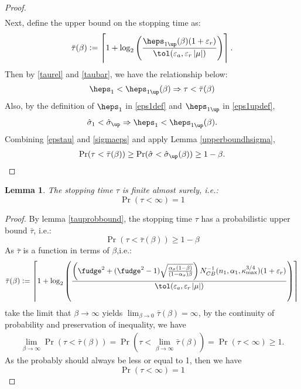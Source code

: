 \documentclass{iitthesis}
\newtheorem{lemma}[theorem]{Lemma}
\begin{document}
\begin{proof}
\begin{align}
\end{align}
Next, define the upper bound on the stopping time as: 
\begin{align}\label{taubarrel}
\bar{\tau}(\beta):= \left \lceil 1+\log_2 \left(\frac{\heps_{1\up}(\beta)(1+\varepsilon_r)}{ \tol(\varepsilon_a,\varepsilon_r \abs{\mu})}\right) \right \rceil.
\end{align}
Then by \eqref{taurel} and \eqref{taubar}, we have the relationship below:
\begin{align} \label{epstau}
 \heps_1 <\heps_{1\up}(\beta) \Rightarrow \tau <\bar{\tau}(\beta)
\end{align}
Also, by the definition of $\heps_1$ in \eqref{eps1def} and $\heps_{1\up}$ in \eqref{eps1updef},
\begin{align}\label{sigmaeps}
 \hsigma_1 < \hsigma_{\up} \Rightarrow \heps_1 < \heps_{1\up}(\beta).
\end{align}
Combining \eqref{epstau} and \eqref{sigmaeps} and apply  Lemma \ref{upperboundhsigma}, 
\begin{align}
\Pr(\tau < \bar{\tau}(\beta)) \geq  \Pr(\hsigma < \hsigma_{\up}(\beta)) \geq 1-\beta.
\end{align}
\end{proof}

\begin{lemma}\label{taufinite}
The stopping time $\tau$ is finite almost surely, i.e.:
$$\Pr(\tau < \infty) = 1$$
\end{lemma}
\begin{proof}
By lemma \ref{tauprobbound}, the stopping time $\tau$ has a probabilistic upper bound $\bar{\tau}$,  i.e.:
$$\Pr(\tau < \bar{\tau}(\beta)) \geq 1-\beta$$
As $\bar{\tau}$ is a function in terms of $\beta$,i.e.:
$$\bar{\tau}(\beta):= \left \lceil 1+\log_2 \left(\frac{\left(\fudge^2+(\fudge^2-1)\sqrt{\frac{\alpha_{\sigma}(1-\beta)}{(1-\alpha_{\sigma})\beta}}\right) N_{CB}^{-1}(n_1,\alpha_1,\kappa_{\max}^{3/4})(1+\varepsilon_r)}{ \tol(\varepsilon_a,\varepsilon_r \abs{\mu})}\right) \right \rceil$$
take the limit that $\beta \to \infty$ yields $\lim_{\beta \to 0} \bar{\tau}(\beta) = \infty$, by the continuity of probability and preservation of inequality,  we have
\begin{align}
\lim_{\beta \to \infty} \Pr(\tau  <\bar{\tau}(\beta)) = \Pr(\tau  <\lim_{\beta \to \infty}\bar{\tau}(\beta)) 
= \Pr(\tau < \infty)  \geq 1.
\end{align}
As the probably should always be less or equal to 1, then we have
$$\Pr(\tau < \infty)  = 1$$
\end{proof}
\end{document}
